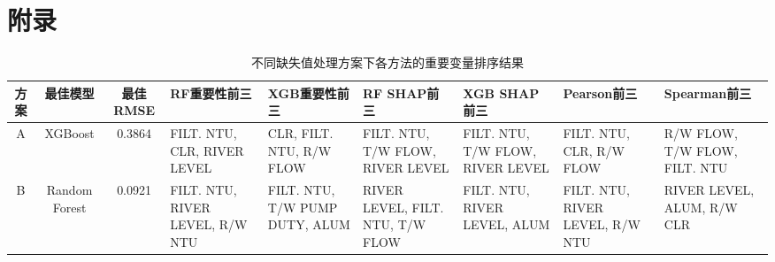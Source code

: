 \documentclass[UTF8,zihao=-4]{ctexart}
\begin{document}
\section{附录}
\begin{table}[H]
\centering
\caption{不同缺失值处理方案下各方法的重要变量排序结果}
\label{tab:importance_appendix}
\small
\begin{tabularx}{\textwidth}{c c c X X X X X X}
\toprule
方案 & 最佳模型 & 最佳RMSE &
RF重要性前三 &
XGB重要性前三 &
RF SHAP前三 &
XGB SHAP前三 &
Pearson前三 &
Spearman前三 \\
\midrule

A &
XGBoost &
0.3864 &
FILT. NTU, CLR, RIVER LEVEL &
CLR, FILT. NTU, R/W FLOW &
FILT. NTU, T/W FLOW, RIVER LEVEL &
FILT. NTU, T/W FLOW, RIVER LEVEL &
FILT. NTU, CLR, R/W FLOW &
R/W FLOW, T/W FLOW, FILT. NTU \\

\midrule

B &
Random Forest &
0.0921 &
FILT. NTU, RIVER LEVEL, R/W NTU &
FILT. NTU, T/W PUMP DUTY, ALUM &
RIVER LEVEL, FILT. NTU, T/W FLOW &
FILT. NTU, RIVER LEVEL, ALUM &
FILT. NTU, RIVER LEVEL, R/W NTU &
RIVER LEVEL, ALUM, R/W CLR \\

\bottomrule
\end{tabularx}
\end{table}
\end{document}
